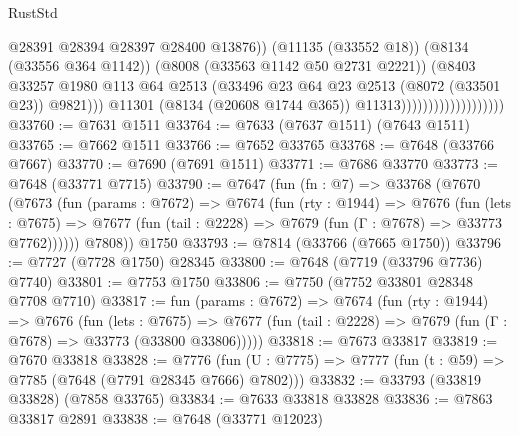 \begin{lexlean}{RustStd}
\begin{coremodule}
{\begin{coremodule}
{{{{{{{{{{{{{{{{{{{{{{{{{{{{{{{{{{{{{{{{{{{{{{{{{{{{{                                                @28391
                                                @28394
                                                @28397
                                                @28400
                                                @13876))
                                            (@11135 (@33552 @18))
                                            (@8134 (@33556 @364 @1142))
                                            (@8008 (@33563 @1142 @50 @2731 @2221))
                                            (@8403
                                              @33257
                                              @1980
                                              @113
                                              @64
                                              @2513
                                              (@33496
                                                @23
                                                @64
                                                @23
                                                @2513
                                                (@8072 (@33501 @23))
                                                @9821)))
                                          @11301
                                          (@8134 (@20608 @1744 @365))
                                          @11313)))))))))))))))))))
@33760 := @7631 @1511
@33764 := @7633 (@7637 @1511) (@7643 @1511)
@33765 := @7662 @1511
@33766 := @7652 @33765
@33768 := @7648 (@33766 @7667)
@33770 := @7690 (@7691 @1511)
@33771 := @7686 @33770
@33773 := @7648 (@33771 @7715)
@33790 := @7647
    (fun (fn : @7) =>
    @33768
      (@7670
        (@7673
          (fun (params : @7672) =>
          @7674
            (fun (rty : @1944) =>
            @7676
              (fun (lets : @7675) =>
              @7677 (fun (tail : @2228) => @7679 (fun (Γ : @7678) => @33773 @7762))))))
        @7808))
    @1750
@33793 := @7814 (@33766 (@7665 @1750))
@33796 := @7727 (@7728 @1750) @28345
@33800 := @7648 (@7719 (@33796 @7736) @7740)
@33801 := @7753 @1750
@33806 := @7750 (@7752 @33801 @28348 @7708 @7710)
@33817 := fun (params : @7672) =>
  @7674
    (fun (rty : @1944) =>
    @7676
      (fun (lets : @7675) =>
      @7677 (fun (tail : @2228) => @7679 (fun (Γ : @7678) => @33773 (@33800 @33806)))))
@33818 := @7673 @33817
@33819 := @7670 @33818
@33828 := @7776
    (fun (U : @7775) => @7777 (fun (t : @59) => @7785 (@7648 (@7791 @28345 @7666) @7802)))
@33832 := @33793 (@33819 @33828) (@7858 @33765)
@33834 := @7633 @33818 @33828
@33836 := @7863 @33817 @2891
@33838 := @7648 (@33771 @12023)
}}}}}}}}}}}}}}}}}}}}}}}}}}}}}}}}}}}}}}}}}}}}}}}}}}}}}
\end{coremodule}}
\end{coremodule}
\end{lexlean}
